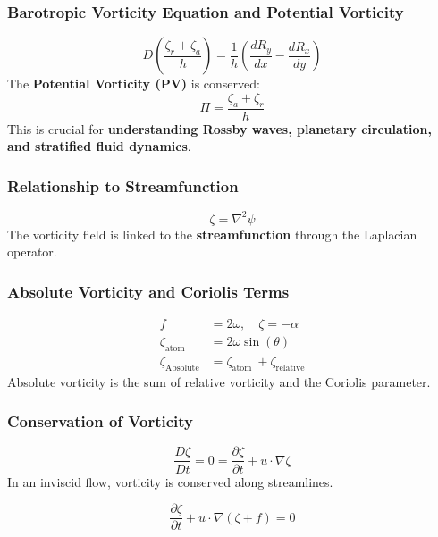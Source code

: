 \documentclass[a4paper,12pt]{article}
\begin{document}
    \subsubsection*{Barotropic Vorticity Equation and Potential Vorticity}
    \begin{equation}
        D\left(\frac{\zeta_r+\zeta_a}{h}\right)=\frac{1}{h}\left(\frac{d R_y}{d x}-\frac{d R_x}{d y}\right)
    \end{equation}
    The \textbf{Potential Vorticity (PV)} is conserved:
    \begin{equation}
        \Pi = \frac{\zeta_a+\zeta_r}{h}
    \end{equation}
    This is crucial for \textbf{understanding Rossby waves, planetary circulation, and stratified fluid dynamics}.

    \subsubsection*{Relationship to Streamfunction}
    \begin{equation}
        \boxed{\zeta = \nabla^2 \psi}
    \end{equation}
    The vorticity field is linked to the \textbf{streamfunction} through the Laplacian operator.

    \subsubsection{Absolute Vorticity and Coriolis Terms}
    \begin{align}
        f &= 2 \omega, \quad \zeta=-\alpha \\
        \zeta_\text{atom} &= 2 \omega \sin (\theta) \\
        \zeta_\text{Absolute} &= \zeta_\text{atom }+\zeta_\text{relative}
    \end{align}
    Absolute vorticity is the sum of relative vorticity and the Coriolis parameter.

    \subsubsection{Conservation of Vorticity}
    \begin{equation*}
        \frac{D \zeta}{D t}=0=\frac{\partial \zeta}{\partial t}+u \cdot \nabla \zeta
    \end{equation*}
    In an inviscid flow, vorticity is conserved along streamlines.

    \begin{equation}
        \frac{\partial \zeta}{\partial t} + u \cdot \nabla(\zeta + f)=0
    \end{equation}
\end{document}
